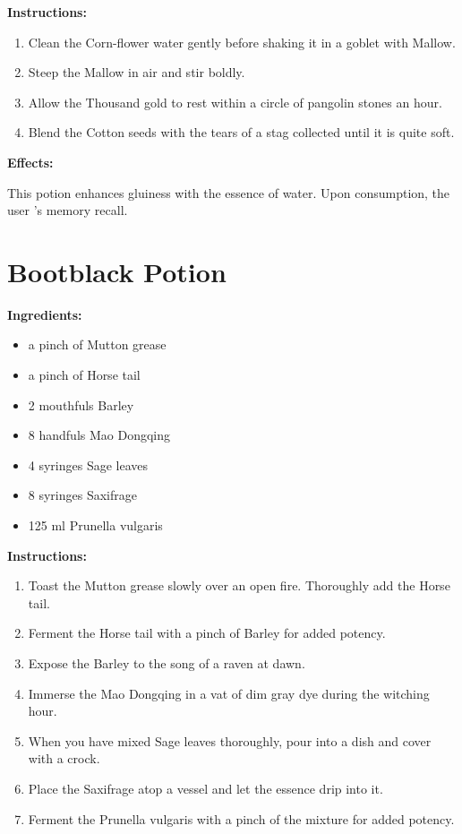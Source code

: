 \documentclass{article}
\begin{document}
\textbf{Instructions:}

\begin{enumerate}
  \item Clean the Corn-flower water gently before shaking it in a goblet with Mallow.
  \item Steep the Mallow in air and stir boldly.
  \item Allow the Thousand gold to rest within a circle of pangolin stones an hour.
  \item Blend the Cotton seeds with the tears of a stag collected until it is quite soft.
\end{enumerate}

\textbf{Effects:}

This potion enhances gluiness with the essence of water. Upon consumption, the user 's memory recall.

\newpage
\section*{Bootblack Potion}

\textbf{Ingredients:}

\begin{itemize}
  \item a pinch of Mutton grease
  \item a pinch of Horse tail
  \item 2 mouthfuls Barley
  \item 8 handfuls Mao Dongqing
  \item 4 syringes Sage leaves
  \item 8 syringes Saxifrage
  \item 125 ml Prunella vulgaris
\end{itemize}

\textbf{Instructions:}

\begin{enumerate}
  \item Toast the Mutton grease slowly over an open fire. Thoroughly add the Horse tail.
  \item Ferment the Horse tail with a pinch of Barley for added potency.
  \item Expose the Barley to the song of a raven at dawn.
  \item Immerse the Mao Dongqing in a vat of dim gray dye during the witching hour.
  \item When you have mixed Sage leaves thoroughly, pour into a dish and cover with a crock.
  \item Place the Saxifrage atop a vessel and let the essence drip into it.
  \item Ferment the Prunella vulgaris with a pinch of the mixture for added potency.
\end{enumerate}
\end{document}

